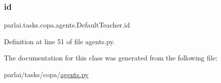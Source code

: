 \subsubsection{\texorpdfstring{id}{id}}
{\footnotesize\ttfamily parlai.\+tasks.\+copa.\+agents.\+Default\+Teacher.\+id}



Definition at line 51 of file agents.\+py.



The documentation for this class was generated from the following file\+:\begin{DoxyCompactItemize}
\item 
parlai/tasks/copa/\hyperlink{parlai_2tasks_2copa_2agents_8py}{agents.\+py}\end{DoxyCompactItemize}
